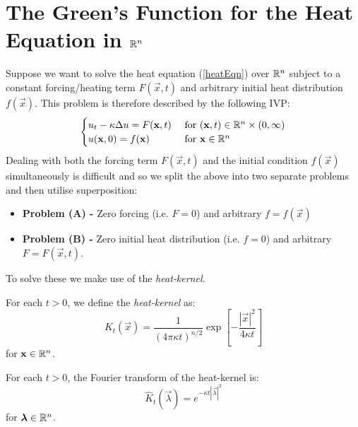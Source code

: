 \documentclass[../main.tex]{subfiles}
\begin{document}
\section{The Green's Function for the Heat Equation in \texorpdfstring{$\mathbb{R}^{n}$}{higher dimensions}}
Suppose we want to solve the heat equation (\cref{heatEqn}) over $\mathbb{R}^{n}$ subject to a constant forcing/heating term $F(\vec{x}, t)$ and arbitrary initial heat distribution $f(\vec{x})$.
This problem is therefore described by the following IVP:
\[
  \begin{cases}
  u_t - \kappa \Delta u = F(\mathbf{\bm{x}}, t) & \text{ for } (\mathbf{\bm{x}}, t) \in \mathbb{R}^{n} \times (0, \infty) \\
  u(\mathbf{\bm{x}}, 0) = f(\mathbf{\bm{x}}) &  \text{ for } \mathbf{\bm{x}} \in \mathbb{R}^{n} \\
  \end{cases}
\]
Dealing with both the forcing term $F(\vec{x}, t)$ and the initial condition $f(\vec{x})$ simultaneously is difficult and so we split the above into two separate problems and then utilise superposition:
\begin{itemize}
  \item \textbf{Problem (A) -} Zero forcing (i.e. $F = 0$) and arbitrary $f = f(\vec{x})$
  \item \textbf{Problem (B) -} Zero initial heat distribution (i.e. $f = 0$) and arbitrary $F = F(\vec{x}, t)$.
\end{itemize}
To solve these we make use of the \textit{heat-kernel}.
\begin{definition}
  For each $t > 0$, we define the \textit{heat-kernel} as:
  \[
    K_t(\vec{x}) = \frac{1}{(4\pi \kappa t)^{n / 2}} \exp\left[-\frac{|\vec{x}|^2}{4 \kappa t}\right]
  \]
  for $\mathbf{\bm{x}} \in \mathbb{R}^{n}$.
\end{definition}
\begin{proposition}
  For each $t > 0$, the Fourier transform of the heat-kernel is:
  \[
    \hat{K}_t(\vec{\lambda}) = e^{-\kappa t |\vec{\lambda}|^2}
  \]
  for $\mathbf{\bm{\lambda}} \in \mathbb{R}^{n}$.
\end{proposition}
\end{document}
